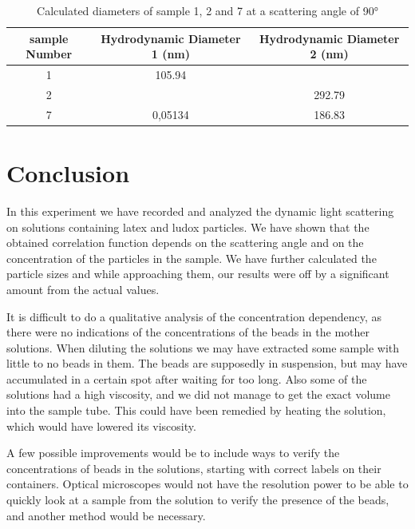 \documentclass{article}
\begin{document}
\begin{table}[!ht]
    \centering
    \begin{tabular}{|c|c|c|}
    \hline
        sample Number & Hydrodynamic Diameter 1 (nm) & Hydrodynamic Diameter 2 (nm) \\ \hline \hline
        1 & 105.94 & ~ \\ \hline
        2 & ~ & 292.79 \\ \hline
        7 & 0,05134 & 186.83 \\ \hline
    \end{tabular}
    \caption{Calculated diameters of sample 1, 2 and 7 at a scattering angle of 90°}
    \label{tab:DiametersSample1+2+7}
\end{table}

\section{Conclusion}

In this experiment we have recorded and analyzed the dynamic light scattering on solutions containing latex and ludox particles. We have shown that the obtained correlation function depends on the scattering angle and on the concentration of the particles in the sample. We have further calculated the particle sizes and while approaching them, our results were off by a significant amount from the actual values.

It is difficult to do a qualitative analysis of the concentration dependency, as there were no indications of the concentrations of the beads in the mother solutions. When diluting the solutions we may have extracted some sample with little to no beads in them. The beads are supposedly in suspension, but may have accumulated in a certain spot after waiting for too long.  Also some of the solutions had a high viscosity, and we did not manage to get the exact volume into the sample tube. This could have been remedied by heating the solution, which would have lowered its viscosity.

A few possible improvements would be to include ways to verify the concentrations of beads in the solutions, starting with correct labels on their containers. Optical microscopes would not have the resolution power to be able to quickly look at a sample from the solution to verify the presence of the beads, and another method would be necessary.

\nocite{LabGuideDLS}
\nocite{introDLS}
\nocite{DLStraining}
\nocite{DLSPracticalGuide}

\printbibliography
\end{document}
